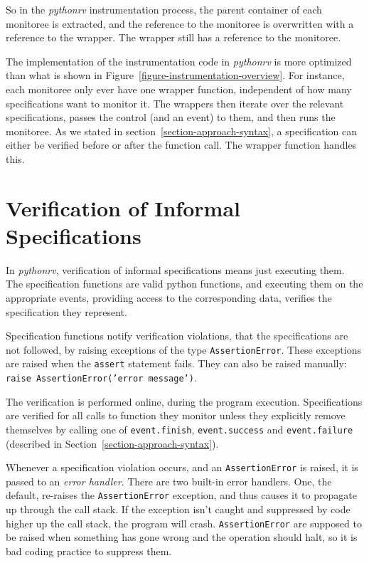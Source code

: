 
So in the \textit{pythonrv} instrumentation process, the parent container of
each monitoree is extracted, and the reference to the monitoree is overwritten
with a reference to the wrapper. The wrapper still has a reference to the
monitoree.

The implementation of the instrumentation code in \textit{pythonrv} is more
optimized than what is shown in Figure~\ref{figure-instrumentation-overview}.
For instance, each monitoree only ever have one wrapper function, independent
of how many specifications want to monitor it. The wrappers then iterate over
the relevant specifications, passes the control (and an event) to them, and
then runs the monitoree. As we stated in section~\ref{section-approach-syntax},
a specification can either be verified before or after the function call. The
wrapper function handles this.



\section{Verification of Informal Specifications}
\label{section-approach-verification}

In \textit{pythonrv}, verification of informal specifications means just
executing them. The specification functions are valid python functions, and
executing them on the appropriate events, providing access to the corresponding
data, verifies the specification they represent.

Specification functions notify verification violations, that the specifications
are not followed, by raising exceptions of the type \texttt{AssertionError}.
These exceptions are raised when the \texttt{assert} statement fails. They can
also be raised manually: \texttt{raise AssertionError('error message')}.

The verification is performed online, during the program execution.
Specifications are verified for all calls to function they monitor unless they
explicitly remove themselves by calling one of \texttt{event.finish},
\texttt{event.success} and \texttt{event.failure} (described in
Section~\ref{section-approach-syntax}).

Whenever a specification violation occurs, and an \texttt{AssertionError} is
raised, it is passed to an \textit{error handler}. There are two built-in error
handlers. One, the default, re-raises the \texttt{AssertionError} exception,
and thus causes it to propagate up through the call stack. If the exception
isn't caught and suppressed by code higher up the call stack, the program will
crash. \texttt{AssertionError} are supposed to be raised when something has
gone wrong and the operation should halt, so it is bad coding practice to
suppress them.

